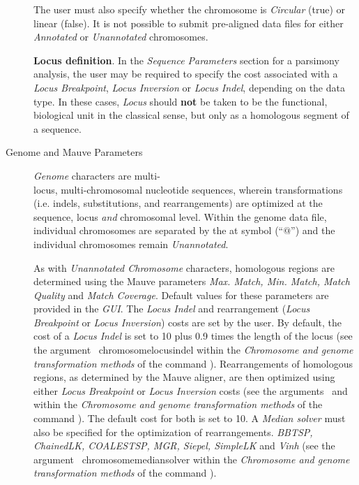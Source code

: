 \begin{description}
		\indent The user must also specify whether the chromosome is \emph{Circular} (true) or linear (false).
		It is not possible to submit pre-aligned data files for either \emph{Annotated} or \emph{Unannotated} 
		chromosomes. 
			
\begin{statement}
    \textbf{Locus definition}. In the \emph{Sequence Parameters} section for a parsimony analysis, the user may be required 
	to specify the cost associated with a \emph{Locus Breakpoint}, \emph{Locus Inversion} or 
	\emph{Locus Indel}, depending on the data type. In these cases, \emph{Locus} should \textbf{not} 
	be taken to be the functional, biological unit in the classical sense, 	but only as a homologous 
	segment of a sequence.
\end{statement}
	
	\item [Genome and Mauve Parameters] \emph{Genome} characters are multi- \\locus, multi-chromosomal nucleotide 
		sequences, wherein transformations (i.e. indels, substitutions, and rearrangements) are optimized 
		at the sequence, locus \emph{and} chromosomal level.  Within the genome data file, individual 
		chromosomes are separated by the at symbol (``$@$'') and the individual chromosomes remain 
		\emph{Unannotated}. 
		
		\indent As with \emph{Unannotated Chromosome} characters, homologous regions are determined 
		using the Mauve parameters \emph{Max. Match, Min. Match, Match Quality} and 
		\emph {Match Coverage}. Default values for these parameters are provided in the \emph{GUI}.
		The \emph{Locus Indel} and rearrangement (\emph{Locus Breakpoint} or \emph{Locus Inversion}) 
		costs are set by the user. By default, the cost of a \emph{Locus Indel} is  set to 10 plus 0.9 times 
		the length of the locus (see the argument~ {chromosomelocusindel}  
		within the \emph{Chromosome and genome transformation methods} of the command 
		).  Rearrangements of homologous regions, as determined  
		by the Mauve aligner, are then optimized using either \emph{Locus Breakpoint} or 
		\emph{Locus Inversion} costs  (see the arguments~ 
		and~ within the \emph{Chromosome 
		and genome transformation methods} of the command ). 
		The default cost for both is set to 10. A \emph{Median solver} must also be specified for the 
		optimization of rearrangements. \emph{BBTSP, ChainedLK, COALESTSP, 
		MGR, Siepel, SimpleLK} and \emph{Vinh} (see the argument~
		{chromosomemediansolver} within the \emph{Chromosome and genome transformation 
		methods} of the command ).
		

\end{description}
